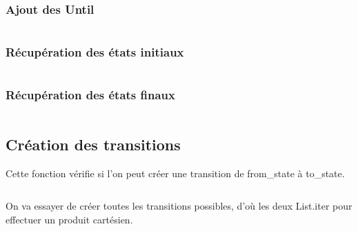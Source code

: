 \documentclass[12pt,a4paper]{article}
\theoremstyle{plain}
\theoremstyle{definition}
\begin{document}
\subsubsection{Ajout des Until}
\inputminted[firstline=101, lastline=116]{ocaml}{prototype/buchi.ml}

\subsubsection{Récupération des états initiaux}
\inputminted[firstline=136, lastline=146]{ocaml}{prototype/buchi.ml}
\subsubsection{Récupération des états finaux}
\inputminted[firstline=150, lastline=164]{ocaml}{prototype/buchi.ml}
\subsection{Création des transitions}
Cette fonction vérifie si l'on peut créer une transition de from\_state à to\_state.
\inputminted[firstline=168, lastline=178, breaklines, breakanywhere]{ocaml}{prototype/buchi.ml}
On va essayer de créer toutes les transitions possibles, d'où les deux List.iter pour effectuer un produit cartésien.
\inputminted[firstline=188, lastline=200, breaklines, breakanywhere]{ocaml}{prototype/buchi.ml}
\end{document}
